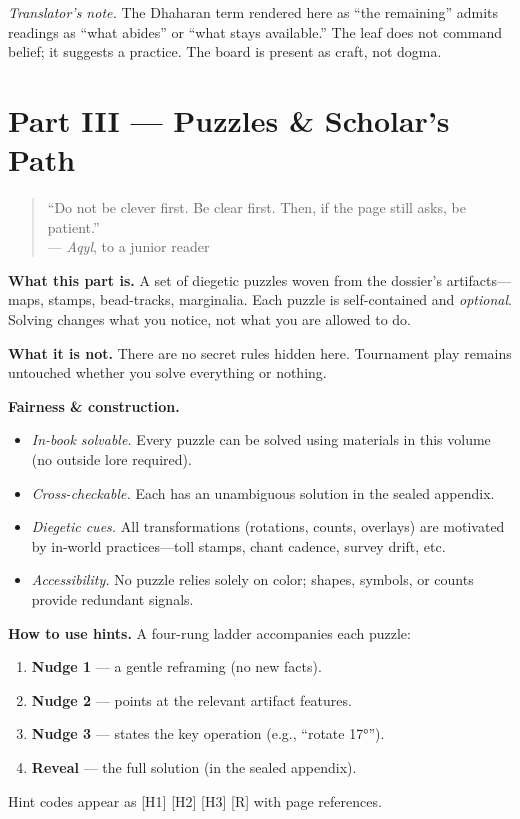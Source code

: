\documentclass[11pt]{article}
\begin{document}
\medskip
\noindent\textit{Translator’s note.} The Dhaharan term rendered here as “the remaining” admits readings as “what abides” or “what stays available.” The leaf does not command belief; it suggests a practice. The board is present as craft, not dogma.


\clearpage
\section{Part III — Puzzles \& Scholar’s Path}
\label{part:puzzles}
{}

\begin{quote}\small
“Do not be clever first. Be clear first. Then, if the page still asks, be patient.”\\
\hfill — \textit{Aqyl}, to a junior reader
\end{quote}

\noindent\textbf{What this part is.} A set of diegetic puzzles woven from the dossier’s artifacts—maps, stamps, bead-tracks, marginalia. Each puzzle is self-contained and \emph{optional}. Solving changes what you notice, not what you are allowed to do.

\medskip
\noindent\textbf{What it is not.} There are no secret rules hidden here. Tournament play remains untouched whether you solve everything or nothing.

\medskip
\noindent\textbf{Fairness \& construction.}
\begin{itemize}\setlength\itemsep{0.3em}
  \item \emph{In-book solvable.} Every puzzle can be solved using materials in this volume (no outside lore required).
  \item \emph{Cross-checkable.} Each has an unambiguous solution in the sealed appendix.
  \item \emph{Diegetic cues.} All transformations (rotations, counts, overlays) are motivated by in-world practices—toll stamps, chant cadence, survey drift, etc.
  \item \emph{Accessibility.} No puzzle relies solely on color; shapes, symbols, or counts provide redundant signals.
\end{itemize}

\medskip
\noindent\textbf{How to use hints.} A four-rung ladder accompanies each puzzle:
\begin{enumerate}\setlength\itemsep{0.25em}
  \item \textbf{Nudge 1} — a gentle reframing (no new facts).
  \item \textbf{Nudge 2} — points at the relevant artifact features.
  \item \textbf{Nudge 3} — states the key operation (e.g., “rotate 17°”).
  \item \textbf{Reveal} — the full solution (in the sealed appendix).
\end{enumerate}
Hint codes appear as \textsc{[H1] [H2] [H3] [R]} with page references.
\end{document}
